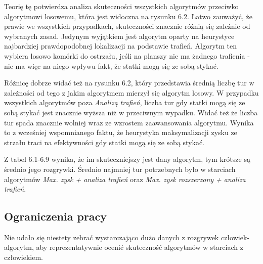 Teorię tę potwierdza analiza skuteczności wszystkich algorytmów przeciwko algorytmowi losowemu, która jest widoczna na rysunku 6.2. Łatwo zauważyć, że prawie we wszystkich przypadkach, skuteczności  znacznie różnią się zależnie od wybranych zasad. Jedynym wyjątkiem jest algorytm oparty na heurystyce najbardziej prawdopodobnej lokalizacji na podstawie trafień. Algorytm ten wybiera losowo komórki do ostrzału, jeśli na planszy nie ma żadnego trafienia - nie ma więc na niego wpływu fakt, że statki mogą się ze sobą stykać.

Różnicę dobrze widać też na rysunku 6.2, który przedstawia średnią liczbę tur w zależności od tego z jakim algorytmem mierzył się algorytm losowy. W przypadku wszystkich algorytmów poza \emph{Analizą trafień}, liczba tur gdy statki mogą się ze sobą stykać jest znacznie wyższa niż w przeciwnym wypadku. Widać też że liczba tur spada znacznie wolniej wraz ze wzrostem zaawansowania algorytmu. Wynika to z wcześniej wspomnianego faktu, że heurystyka maksymalizacji zysku ze strzału traci na efektywności gdy statki mogą się ze sobą stykać.

Z tabel 6.1-6.9 wynika, że im skuteczniejszy jest dany algorytm, tym krótsze są średnio jego rozgrywki. Średnio najmniej tur potrzebnych było w starciach algorytmów \emph{Max. zysk + analiza trafień} oraz \emph{Max. zysk rozszerzony + analiza trafień}.


\subsection{Ograniczenia pracy}
Nie udało się niestety zebrać wystarczająco dużo danych z rozgrywek człowiek-algorytm, aby reprezentatywnie ocenić skuteczność algorytmów w starciach z człowiekiem.
